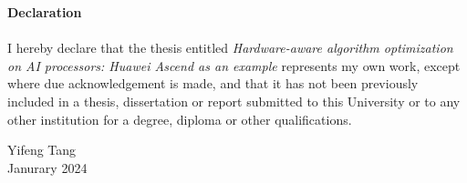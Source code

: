 \centering
{\bf \large Declaration}\\
~\\
\justifying
I hereby declare that the thesis entitled \textit{Hardware-aware algorithm optimization on AI processors: Huawei Ascend as an example} represents my own work, except where due acknowledgement is made, and that it has not been previously included in a thesis, dissertation or report submitted to this University or to any other institution for a degree, diploma or other qualifications.

\flushright

Yifeng Tang\\
Janurary 2024\\

\justifying